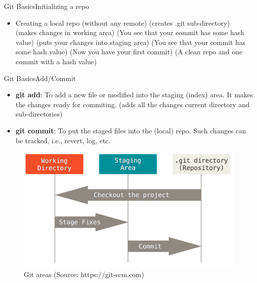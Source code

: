 \documentclass{beamer}
\begin{document}
\begin{frame}{Git Basics}{Initializing a repo}
  \begin{itemize}
    \item Creating a local repo (without any remote)
     (creates .git sub-directory)
     (makes changes in  working area)
     (You see that your commit has some hash value)
     (puts your changes into staging area)
     (You see that your commit has some hash value)
     (Now you have your first commit)
     (A clean repo and one commit with a hash value)
  \end{itemize}
\end{frame}

\begin{frame}{Git Basics}{Add/Commit}
  \begin{itemize}
    \item \textbf{git add}: To add a new file or modified into the staging (index) area. It makes 
      the changes ready for commiting.
       (adds all the changes current directory and sub-directories)
    \item \textbf{git commit}: To put the staged files into the (local) repo. Such changes can be tracked, i.e.,
      revert, log, etc.
  \end{itemize}
  \begin{figure}
    \begin{center}
    \includegraphics[width=0.55\linewidth]{pics/areas.png}
    \caption{\small Git areas (Source: https://git-scm.com)}
  \end{center}
\end{figure}
\end{frame}

%
\end{document}
